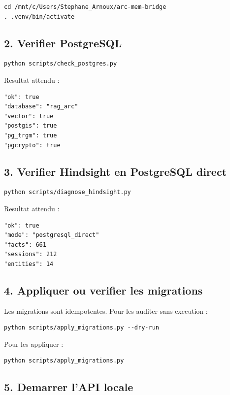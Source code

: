 \documentclass[11pt,a4paper]{article}
\begin{document}
\begin{lstlisting}
cd /mnt/c/Users/Stephane_Arnoux/arc-mem-bridge
. .venv/bin/activate
\end{lstlisting}

\subsection{2. Verifier PostgreSQL}

\begin{lstlisting}
python scripts/check_postgres.py
\end{lstlisting}

Resultat attendu :

\begin{lstlisting}
"ok": true
"database": "rag_arc"
"vector": true
"postgis": true
"pg_trgm": true
"pgcrypto": true
\end{lstlisting}

\subsection{3. Verifier Hindsight en PostgreSQL direct}

\begin{lstlisting}
python scripts/diagnose_hindsight.py
\end{lstlisting}

Resultat attendu :

\begin{lstlisting}
"ok": true
"mode": "postgresql_direct"
"facts": 661
"sessions": 212
"entities": 14
\end{lstlisting}

\subsection{4. Appliquer ou verifier les migrations}

Les migrations sont idempotentes. Pour les auditer sans execution :

\begin{lstlisting}
python scripts/apply_migrations.py --dry-run
\end{lstlisting}

Pour les appliquer :

\begin{lstlisting}
python scripts/apply_migrations.py
\end{lstlisting}

\subsection{5. Demarrer l'API locale}
\end{document}
